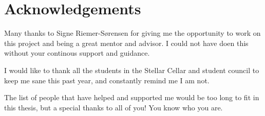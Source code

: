 \section*{Acknowledgements}

Many thanks to Signe Riemer-S{\o}rensen for giving me the opportunity to work on this project and being a great mentor and advisor. I could not have doen this without your continous support and guidance.

I would like to thank all the students in the Stellar Cellar and student council to keep me sane this past year, and constantly remind me I am not.

The list of people that have helped and supported me would be too long to fit in this thesis, but a special thanks to all of you!
You know who you are.

\newpage
